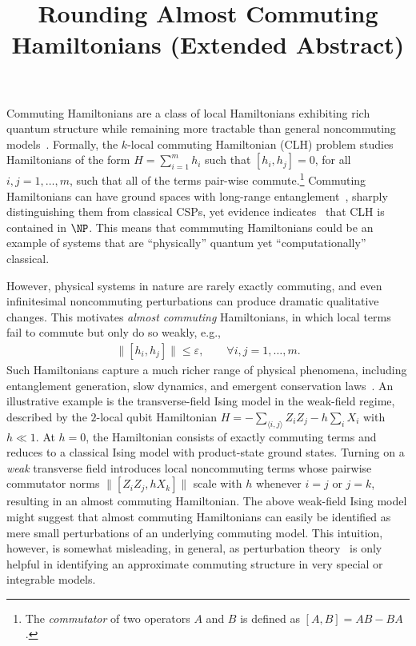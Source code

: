 \documentclass[11pt]{article}
\title{\hspace{6mm}Rounding Almost Commuting Hamiltonians\newline
\large (Extended Abstract)}
\date{}
\theoremstyle{plain}
\newcommand{\eps}{\varepsilon}
\begin{document}
\maketitle
\vspace*{-2.3cm}

Commuting Hamiltonians are a class of local Hamiltonians exhibiting rich quantum structure while remaining more tractable than general noncommuting models~\cite{bravyi2004commutativeversionklocalhamiltonian,aharonov2011complexity,schuch2011complexitycommutinghamiltonianssquare,AKV,irani2023commutinglocalhamiltonianproblem,bostanci2025commutinglocalhamiltonians2d}.
Formally, the $k$-local commuting Hamiltonian (CLH) problem studies Hamiltonians of the form $H=\sum_{i=1}^m h_i$ such that $[h_i,h_j]=0$, for all $i,j=1,\dots,m$, such that all of the terms pair-wise commute.\footnote{The \emph{commutator} of two operators $A$ and $B$ is defined as $[A,B] = AB - BA$.}
Commuting Hamiltonians can have ground spaces with long-range entanglement~\cite{aharonov2011complexity}, sharply distinguishing them from classical CSPs, yet evidence indicates~\cite{bravyi2004commutativeversionklocalhamiltonian,irani2023commutinglocalhamiltonianproblem,bostanci2025commutinglocalhamiltonians2d} that CLH is contained in $\NP$. This means that commmuting Hamiltonians could be an example of systems that are ``physically'' quantum yet ``computationally'' classical.

However, physical systems in nature are rarely exactly commuting, and even infinitesimal noncommuting perturbations can produce dramatic qualitative changes. 
 This motivates \emph{almost commuting} Hamiltonians, in 
 which local terms fail to commute but only do so weakly, e.g.,
\begin{align}
\|[h_i,h_j]\| \leq \eps, \quad\quad \forall i,j=1,\dots,m.   
\end{align}
Such Hamiltonians capture a much richer range of physical phenomena, including 
entanglement generation, slow dynamics, and emergent conservation laws~\cite{Sachdev2011}. 
An illustrative example is the transverse-field Ising model 
in the weak-field regime, described by the $2$-local qubit Hamiltonian
$
H = -\sum_{\langle i,j \rangle} Z_i Z_j - h \sum_i X_i$
with $h \ll 1$.  At $h=0$, the Hamiltonian consists of exactly 
commuting terms and reduces to a classical Ising model with 
product-state ground states.  Turning on a \emph{weak} transverse field 
introduces local noncommuting terms whose pairwise commutator norms 
$\|[Z_i Z_j,hX_k]\|$
scale with $h$ whenever $i=j$ or $j=k$, resulting in an almost commuting Hamiltonian. The above weak-field Ising model might suggest that almost commuting Hamiltonians can easily be identified as mere small perturbations of an underlying commuting model. This intuition, however, is somewhat misleading, in general, as perturbation theory~\cite{Kato:1966:PTL} is only helpful in identifying an approximate commuting structure in very special or integrable models.
\end{document}
